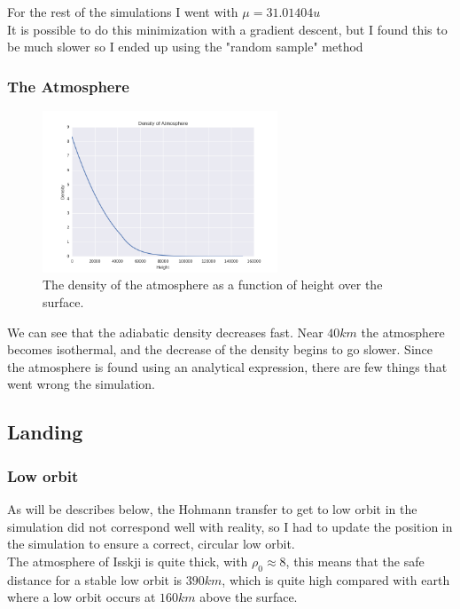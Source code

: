 \documentclass[a4paper, 10pt]{article}
\begin{document}
For the rest of the simulations I went with $\mu = 31.01404 u$\\

It is possible to do this minimization with a gradient descent, but I found this to be much slower so I ended up using the "random sample" method  

\subsubsection{The Atmosphere}

\begin{figure}[H]
\centering
\includegraphics[width = 70mm]{part6atmos.png}
\caption{The density of the atmosphere as a function of height over the surface.}
\end{figure}

We can see that the adiabatic density decreases fast. Near $40 km$ the atmosphere becomes isothermal, and the decrease of the density begins to go slower. Since the atmosphere is found using an analytical expression, there are few things that went wrong the simulation.

\subsection{Landing}
\subsubsection{Low orbit}
As will be describes below, the Hohmann transfer to get to low orbit in the simulation did not correspond well with reality, so I had to update the position in the simulation to ensure a correct, circular low orbit.\\

The atmosphere of Isskji is quite thick, with $\rho_0 \approx 8$, this means that the safe distance for a stable low orbit is $390 km$, which is quite high compared with earth where a low orbit occurs at $160 km$ above the surface.\\
\end{document}
